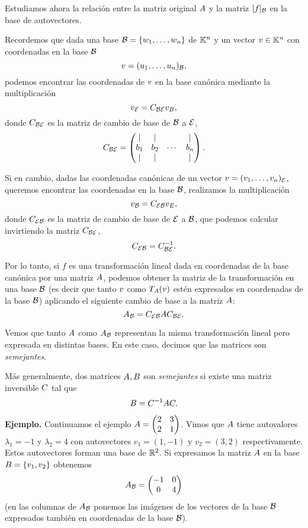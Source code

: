 Estudiamos ahora la relación entre la matriz original $\Ab$ y la matriz $[f]_\mathcal B$ en la base de autovectores.

Recordemos que dada una base $\B = \{\wb_1, \dots, \wb_n\}$ de $\mathbb K^{n}$ y un vector $\vb \in \Kn$ con coordenadas en la base $\mathcal B$
$$
\vb = (u_1, \dots, u_n)_\B,
$$
podemos encontrar las coordenadas de $\vb$ en la base canónica mediante la multiplicación
$$
\vb_\E = \Cb_{\B\E} \vb_B,
$$
donde $\Cb_{\B\E}$ es la matriz de cambio de base de $\mathcal B$ a $\mathcal E$,
$$\Cb_{\B\E} = \begin{pmatrix} \mid & \mid & & \mid \\ {\bb}_{1} & {\bb}_{2} & \cdots & {\bb}_{n}\\ \mid & \mid & & \mid \\ \end{pmatrix}.$$

Si en cambio, dadas las coordenadas canónicas de un vector $\vb = (v_1, \dots, v_n)_\E$, queremos encontrar las coordenadas en la base $\mathcal B$, realizamos la multiplicación
$$
\vb_\B = \Cb_{\E\B} \vb_E,
$$
donde $\Cb_{\E\B}$ es la matriz de cambio de base de $\mathcal E$ a $\mathcal B$, que podemos calcular invirtiendo la matriz $\Cb_{\B\E}$,
$$
\Cb_{\E\B} = \Cb_{\B\E}^{-1}.
$$

Por lo tanto, si $f$ es una transformación lineal dada en coordenadas de la base canónica por una matriz $\Ab$, podemos obtener la matriz de la transformación en una base $\mathcal B$ (es decir que
tanto $\vb$ como $T_{\Ab}(\vb)$ estén expresados en coordenadas de la base $\mathcal B$)
aplicando el siguiente cambio de base a la matriz $\Ab$:
$$
\Ab_\B = \Cb_{\E\B} \Ab \Cb_{\B\E}.
$$

Vemos que tanto $\Ab$ como $\Ab_\B$ representan la misma transformación
lineal pero expresada en distintas bases. En este caso, decimos que las
matrices son \emph{semejantes}.

Más generalmente, dos matrices $\Ab, \Bb$ son \emph{semejantes} si existe una
matriz inversible $\Cb$ tal que
$$\Bb = \Cb^{-1} \Ab \Cb.$$

\textbf{Ejemplo.} Continuamos el ejemplo
$\Ab = \begin{pmatrix} 2 & 3 \\ 2 & 1 \end{pmatrix}$. Vimos que $\Ab$ tiene
autovalores $\lambda_1 = -1$ y $\lambda_2 = 4$ con autovectores
$v_{1} = (1, -1)$ y $v_{2} = (3, 2)$ respectivamente. Estos autovectores
forman una base de $\mathbb R^2$. Si expresamos la matriz $\Ab$ en la base
$\Bb = \{v_{1}, v_2\}$ obtenemos
$$
\Ab_\B = \begin{pmatrix} -1 & 0 \\ 0 & 4 \end{pmatrix}
$$
(en las columnas de $\Ab_\B$ ponemos las imágenes de los vectores de la
base $\mathcal B$ expresados también en coordenadas de la base $\mathcal B$).

